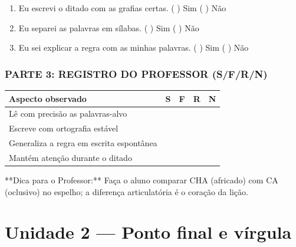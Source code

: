 \begin{exercicio}
\begin{enumerate}[label=\alph*)]
  \item Eu escrevi o ditado com as grafias certas.  \quad ( ) Sim   ( ) Não

  \item Eu separei as palavras em sílabas.  \quad ( ) Sim   ( ) Não

  \item Eu sei explicar a regra com as minhas palavras.  \quad ( ) Sim   ( ) Não

\end{enumerate}

\subsection*{PARTE 3: REGISTRO DO PROFESSOR (S/F/R/N)}

\begin{center}
\renewcommand{\arraystretch}{1.4}
\begin{tabular}{@{}p{9cm}cccc@{}}
\toprule
Aspecto observado & S & F & R & N \\
\midrule
Lê com precisão as palavras-alvo & & & & \\
Escreve com ortografia estável & & & & \\
Generaliza a regra em escrita espontânea & & & & \\
Mantém atenção durante o ditado & & & & \\
\bottomrule\end{tabular}\end{center}

\end{exercicio}

\begin{dica}
**Dica para o Professor:** Faça o aluno comparar CHA (africado) com CA (oclusivo) no espelho; a diferença articulatória é o coração da lição.
\end{dica}



\chapter{Unidade 2 --- Ponto final e vírgula}


